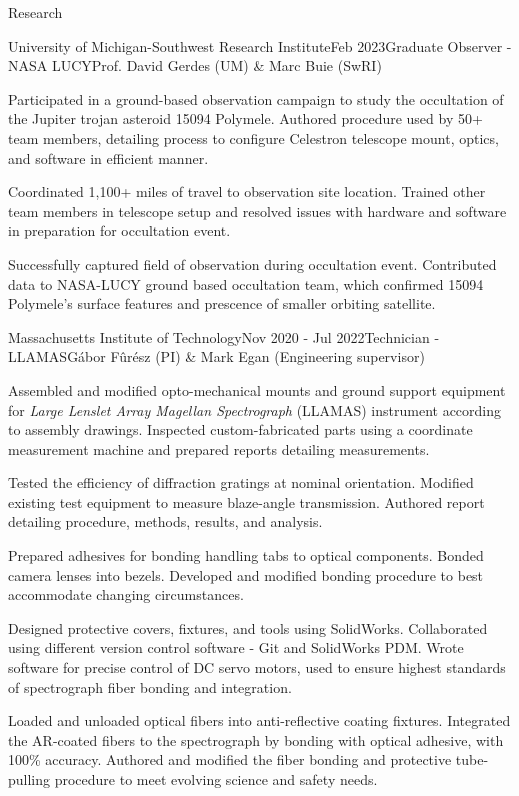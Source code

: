 \documentclass{resume} %
\begin{document}
\begin{rSection}{Research}
\begin{rSubsection}{University of Michigan-Southwest Research Institute}{Feb 2023}{Graduate Observer - NASA LUCY}{Prof. David Gerdes (UM) \& Marc Buie (SwRI)}
    \item Participated in a ground-based observation campaign to study the occultation of the Jupiter trojan asteroid 15094 Polymele. Authored procedure used by 50+ team members, detailing process to configure Celestron telescope mount, optics, and software in efficient manner.
    \item Coordinated 1,100+ miles of travel to observation site location. Trained other team members in telescope setup and resolved issues with hardware and software in preparation for occultation event.
    \item Successfully captured field of observation during occultation event. Contributed data to NASA-LUCY ground based occultation team, which confirmed 15094 Polymele's surface features and prescence of smaller orbiting satellite.
\end{rSubsection}
\begin{rSubsection}{Massachusetts Institute of Technology}{Nov 2020 - Jul 2022}{Technician - LLAMAS}{G\'abor F\^ur\'esz (PI) \& Mark Egan (Engineering supervisor)}
\item Assembled and modified opto-mechanical mounts and ground support equipment for \textit{Large Lenslet Array Magellan Spectrograph} (LLAMAS) instrument according to assembly drawings. Inspected custom-fabricated parts using a coordinate measurement machine and prepared reports detailing measurements.
\item Tested the efficiency of diffraction gratings at nominal orientation. Modified existing test equipment to measure blaze-angle transmission. Authored report detailing procedure, methods, results, and analysis.
\item Prepared  adhesives for bonding handling tabs to optical components. Bonded camera lenses into bezels. Developed and modified bonding procedure to best accommodate changing circumstances. 
\item Designed protective covers, fixtures, and tools using SolidWorks. Collaborated using different version control software - Git and SolidWorks PDM. Wrote software for precise control of DC servo motors, used to ensure highest standards of spectrograph fiber bonding and integration.
\item Loaded and unloaded optical fibers into anti-reflective coating fixtures. Integrated the AR-coated fibers to the spectrograph by bonding with optical adhesive, with 100\% accuracy. Authored and modified the fiber bonding and protective tube-pulling procedure to meet evolving science and safety needs.
\end{rSubsection}


\end{rSection}
\end{document}
